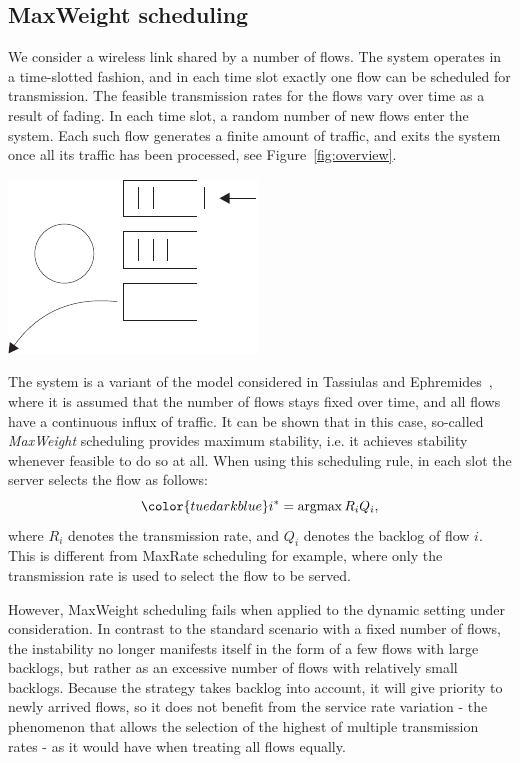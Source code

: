 \documentclass[a4paper,11pt]{article}
\DeclareMathOperator{\argmax}{argmax}                        %
\begin{document}
\begin{slidetop}
\begin{multicols}{2}
\section*{MaxWeight scheduling}
We consider a wireless link shared by a number of flows. The system operates in a time-slotted fashion, and in each time slot exactly one flow can be scheduled for transmission. The feasible transmission rates for the flows vary over time as a result of fading. In each time slot, a random number of new flows enter the system. Each such flow generates a finite amount of traffic, and exits the system once all its traffic has been processed, see Figure~\ref{fig:overview}.

\begin{center}
\includegraphics[width=0.6\linewidth]{System_overview}
\end{center}

The system is a variant of the model considered in Tassiulas and Ephremides~\cite{TE93}, where it is assumed that the number of flows stays fixed over time, and all flows have a continuous influx of traffic. It can be shown that in this case, so-called {\em MaxWeight} scheduling provides maximum stability, i.e. it achieves stability whenever feasible to do so at all. When using this scheduling rule, in each slot the server selects the flow as follows:
\[
\color{tuedarkblue}
i^* = \argmax R_i Q_i,
\]
where $R_i$ denotes the transmission rate, and $Q_i$ denotes the backlog of flow $i$. This is different from MaxRate scheduling for example, where only the transmission rate is used to select the flow to be served.

However, MaxWeight scheduling fails when applied to the dynamic setting under consideration. In contrast to the standard scenario with a fixed number of flows, the instability no longer manifests itself in the form of a few flows with large backlogs, but rather as an excessive number of flows with relatively small backlogs. Because the strategy takes backlog into account, it will give priority to newly arrived flows, so it does not benefit from the service rate variation - the phenomenon that allows the selection of the highest of multiple transmission rates - as it would have when treating all flows equally.


\end{multicols}
\end{slidetop}
\end{document}
